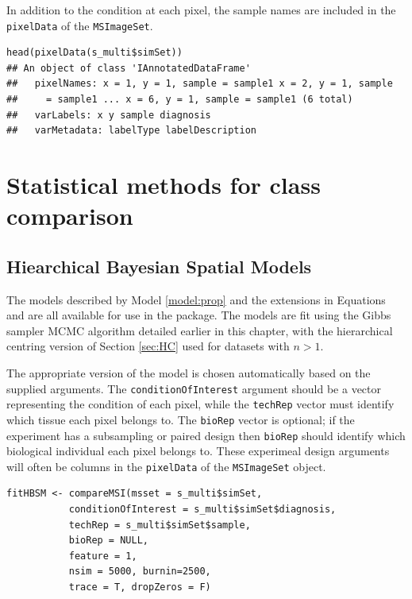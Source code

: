 \documentclass[a4paper]{article}\usepackage[]{graphicx}\usepackage[]{color}
\makeatletter
\newenvironment{kframe}{%
 \def\at@end@of@kframe{}%
 \ifinner\ifhmode%
  \def\at@end@of@kframe{\end{minipage}}%
  \begin{minipage}{\columnwidth}%
 \fi\fi%
 \def\FrameCommand##1{\hskip\@totalleftmargin \hskip-\fboxsep
 \colorbox{shadecolor}{##1}\hskip-\fboxsep
     \hskip-\linewidth \hskip-\@totalleftmargin \hskip\columnwidth}%
 \MakeFramed {\advance\hsize-\width
   \@totalleftmargin\z@ \linewidth\hsize
   \@setminipage}}%
 {\par\unskip\endMakeFramed%
 \at@end@of@kframe}
\newenvironment{knitrout}{}{} %
\makeatother
\begin{document}
In addition to the condition at each pixel, the sample names are included in the \texttt{pixelData} of the \texttt{MSImageSet}.

\begin{knitrout}
\color{fgcolor}\begin{kframe}
\begin{verbatim}
head(pixelData(s_multi$simSet))
## An object of class 'IAnnotatedDataFrame'
##   pixelNames: x = 1, y = 1, sample = sample1 x = 2, y = 1, sample
##     = sample1 ... x = 6, y = 1, sample = sample1 (6 total)
##   varLabels: x y sample diagnosis
##   varMetadata: labelType labelDescription
\end{verbatim}
\end{kframe}
\end{knitrout}


\section{Statistical methods for class comparison}
\subsection{Hiearchical Bayesian Spatial Models}
The models described by Model \ref{model:prop} and the extensions in Equations \label{formula:spUnpaired} and \label{formula:Unpaired} are all available for use in the package. The models are fit using the Gibbs sampler MCMC algorithm detailed earlier in this chapter, with the hierarchical centring version of Section \ref{sec:HC} used for datasets with $n>1$.

The appropriate version of the model is chosen automatically based on the supplied arguments. The \texttt{conditionOfInterest} argument should be a vector representing the condition of each pixel, while the \texttt{techRep} vector must identify which tissue each pixel belongs to. The \texttt{bioRep} vector is optional; if the experiment has a subsampling or paired design then \texttt{bioRep} should identify which biological individual each pixel belongs to. These experimeal design arguments will often be columns in the \texttt{pixelData} of the \texttt{MSImageSet} object.

\begin{knitrout}
\color{fgcolor}\begin{kframe}
\begin{verbatim}
fitHBSM <- compareMSI(msset = s_multi$simSet,
           conditionOfInterest = s_multi$simSet$diagnosis,
           techRep = s_multi$simSet$sample,
           bioRep = NULL,
           feature = 1,
           nsim = 5000, burnin=2500,
           trace = T, dropZeros = F)
\end{verbatim}
\end{kframe}
\end{knitrout}
\end{document}
